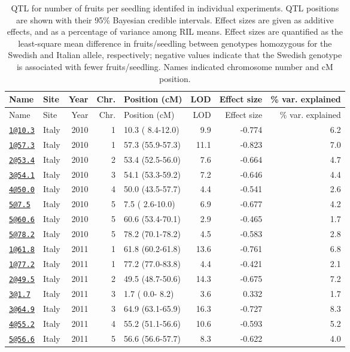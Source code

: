 \documentclass[]{article}
\begin{document}
\begin{longtable}[]{@{}llrrlrrr@{}}
\caption{\label{tab:individual-ffit-qtl}QTL for number of fruits per seedling identifed in individual experiments. QTL positions are shown with their 95\% Bayesian credible intervals. Effect sizes are given as additive effects, and as a percentage of variance among RIL means. Effect sizes are quantified as the least-square mean difference in fruits/seedling between genotypes homozygous for the Swedish and Italian allele, respectively; negative values indicate that the Swedish genotype is associated with fewer fruits/seedling. Names indicated chromosome number and cM position.}\tabularnewline
\toprule
Name & Site & Year & Chr. & Position (cM) & LOD & Effect size & \% var. explained\tabularnewline
\midrule
\endfirsthead
\toprule
Name & Site & Year & Chr. & Position (cM) & LOD & Effect size & \% var. explained\tabularnewline
\midrule
\endhead
\href{mailto:1@10.3}{\nolinkurl{1@10.3}} & Italy & 2010 & 1 & 10.3 ( 8.4-12.0) & 9.9 & -0.774 & 6.2\tabularnewline
\href{mailto:1@57.3}{\nolinkurl{1@57.3}} & Italy & 2010 & 1 & 57.3 (55.9-57.3) & 11.1 & -0.823 & 7.0\tabularnewline
\href{mailto:2@53.4}{\nolinkurl{2@53.4}} & Italy & 2010 & 2 & 53.4 (52.5-56.0) & 7.6 & -0.664 & 4.7\tabularnewline
\href{mailto:3@54.1}{\nolinkurl{3@54.1}} & Italy & 2010 & 3 & 54.1 (53.3-59.2) & 7.2 & -0.646 & 4.4\tabularnewline
\href{mailto:4@50.0}{\nolinkurl{4@50.0}} & Italy & 2010 & 4 & 50.0 (43.5-57.7) & 4.4 & -0.541 & 2.6\tabularnewline
\href{mailto:5@7.5}{\nolinkurl{5@7.5}} & Italy & 2010 & 5 & 7.5 ( 2.6-10.0) & 6.9 & -0.677 & 4.2\tabularnewline
\href{mailto:5@60.6}{\nolinkurl{5@60.6}} & Italy & 2010 & 5 & 60.6 (53.4-70.1) & 2.9 & -0.465 & 1.7\tabularnewline
\href{mailto:5@78.2}{\nolinkurl{5@78.2}} & Italy & 2010 & 5 & 78.2 (70.1-78.2) & 4.5 & -0.583 & 2.8\tabularnewline
\href{mailto:1@61.8}{\nolinkurl{1@61.8}} & Italy & 2011 & 1 & 61.8 (60.2-61.8) & 13.6 & -0.761 & 6.8\tabularnewline
\href{mailto:1@77.2}{\nolinkurl{1@77.2}} & Italy & 2011 & 1 & 77.2 (77.0-83.8) & 4.4 & -0.421 & 2.1\tabularnewline
\href{mailto:2@49.5}{\nolinkurl{2@49.5}} & Italy & 2011 & 2 & 49.5 (48.7-50.6) & 14.3 & -0.675 & 7.2\tabularnewline
\href{mailto:3@1.7}{\nolinkurl{3@1.7}} & Italy & 2011 & 3 & 1.7 ( 0.0- 8.2) & 3.6 & 0.332 & 1.7\tabularnewline
\href{mailto:3@64.9}{\nolinkurl{3@64.9}} & Italy & 2011 & 3 & 64.9 (63.1-65.9) & 16.3 & -0.727 & 8.3\tabularnewline
\href{mailto:4@55.2}{\nolinkurl{4@55.2}} & Italy & 2011 & 4 & 55.2 (51.1-56.6) & 10.6 & -0.593 & 5.2\tabularnewline
\href{mailto:5@56.6}{\nolinkurl{5@56.6}} & Italy & 2011 & 5 & 56.6 (56.6-57.7) & 8.3 & -0.622 & 4.0\tabularnewline

\end{longtable}
\end{document}
